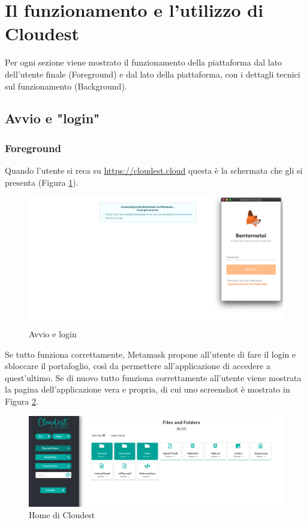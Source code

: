 \documentclass{article}
\begin{document}
\newpage
\section{Il funzionamento e l'utilizzo di Cloudest}

Per ogni sezione viene mostrato il funzionamento della piattaforma dal lato dell'utente finale (Foreground) e dal lato della piattaforma, con i dettagli tecnici sul funzionamento (Background).

\subsection{Avvio e "login"}
\subsubsection{Foreground}
Quando l'utente si reca su \href{https://cloudest.cloud}{https://cloudest.cloud} questa è la schermata che gli si presenta (Figura \ref{fig:login}).
\begin{figure}[!ht]
  \includegraphics[width=14cm]{images/login.png}
  \centering
  \caption{Avvio e login}
  \label{fig:login}
\end{figure}
Se tutto funziona correttamente, Metamask propone all'utente di fare il login e sbloccare il portafoglio, così da permettere all'applicazione di accedere a quest'ultimo. Se di nuovo tutto funziona correttamente all'utente viene mostrata la pagina dell'applicazione vera e propria, di cui uno screenshot è mostrato in Figura \ref{fig:home}.
\begin{figure}[!ht]
  \includegraphics[width=16cm]{images/home.png}
  \centering
  \caption{Home di Cloudest}
  \label{fig:home}
\end{figure}
\end{document}
